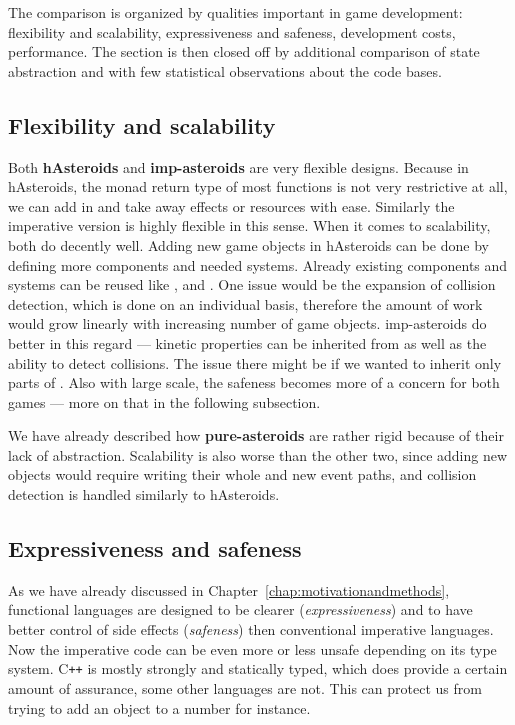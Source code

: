 \documentclass[
  digital, %
  color,   %
  table,   %
  oneside, %
  lof,     %
  lot,     %
]{fithesis3}
\newcommand{\cpp}{C\nolinebreak\texttt{+}\nolinebreak\texttt{+}}
\begin{document}
{The comparison is organized by qualities important in game development:
flexibility and scalability, expressiveness and safeness, development costs, performance.
The section is then closed off by additional comparison of state abstraction
and with few statistical observations about the code bases.



\subsection{Flexibility and scalability}

Both \textbf{hAsteroids} and \textbf{imp-asteroids} are very flexible designs.
Because in hAsteroids, the monad return type of most functions is not very
restrictive at all, we can add in and take away effects or resources with ease.
Similarly the imperative version is highly flexible in this sense. When it comes
to scalability, both do decently well. Adding new game objects in hAsteroids can be done by
defining more components and needed systems. Already existing components and systems can be reused
like ,  and .
One issue would be the expansion of collision detection,
which is done on an individual basis, therefore the amount of work
would grow linearly with increasing number of game objects.
imp-asteroids do better in this regard --- kinetic properties can
be inherited from  as well as the ability to detect collisions.
The issue there might be if we wanted to inherit only parts of .
Also with large scale, the safeness becomes more of a concern for both games
--- more on that in the following subsection.

We have already described how \textbf{pure-asteroids} are rather rigid because of
their lack of abstraction. Scalability is also worse than the other two, since
adding new objects would require writing their whole  and
new event paths, and collision detection is handled similarly to hAsteroids.



\subsection{Expressiveness and safeness}

As we have already discussed in Chapter~\ref{chap:motivationandmethods},
functional languages are designed to be clearer (\emph{expressiveness})
and to have better control of side effects (\emph{safeness}) then conventional
imperative languages. Now the imperative code can be even more or less unsafe
depending on its type system. \cpp{} is mostly strongly and statically typed, which
does provide a certain amount of assurance, some other languages are not.
This can protect us from trying to add an object to a number for instance.

}
\end{document}
